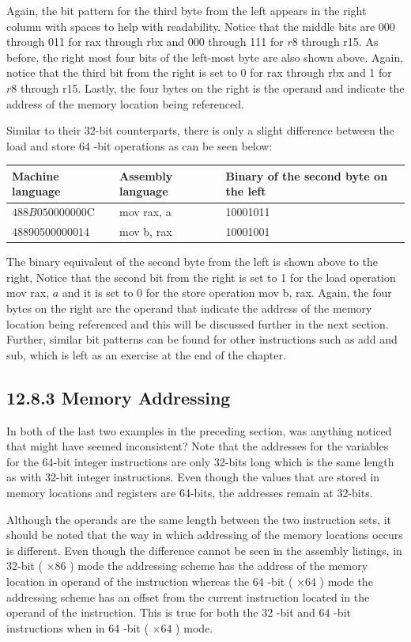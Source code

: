 \documentclass[10pt]{article}
\begin{document}
Again, the bit pattern for the third byte from the left appears in the right column with spaces to help with readability. Notice that the middle bits are 000 through 011 for rax through rbx and 000 through 111 for $r 8$ through r15. As before, the right most four bits of the left-most byte are also shown above. Again, notice that the third bit from the right is set to 0 for rax through rbx and 1 for $r 8$ through r15. Lastly, the four bytes on the right is the operand and indicate the address of the memory location being referenced.

Similar to their 32-bit counterparts, there is only a slight difference between the load and store 64 -bit operations as can be seen below:

\begin{center}
\begin{tabular}{|l|l|l|}
\hline
Machine language & Assembly language & Binary of the second byte on the left \\
\hline
$488 B 050000000 \mathrm{C}$ & mov rax, a & 10001011 \\
\hline
48890500000014 & mov b, rax & 10001001 \\
\hline
\end{tabular}
\end{center}

The binary equivalent of the second byte from the left is shown above to the right, Notice that the second bit from the right is set to 1 for the load operation mov rax, $a$ and it is set to 0 for the store operation mov b, rax. Again, the four bytes on the right are the operand that indicate the address of the memory location being referenced and this will be discussed further in the next section. Further, similar bit patterns can be found for other instructions such as add and sub, which is left as an exercise at the end of the chapter.

\subsection*{12.8.3 Memory Addressing}
In both of the last two examples in the preceding section, was anything noticed that might have seemed inconsistent? Note that the addresses for the variables for the 64-bit integer instructions are only 32-bits long which is the same length as with 32-bit integer instructions. Even though the values that are stored in memory locations and registers are 64-bits, the addresses remain at 32-bits.

Although the operands are the same length between the two instruction sets, it should be noted that the way in which addressing of the memory locations occurs is different. Even though the difference cannot be seen in the assembly listings, in 32-bit ( $\times 86$ ) mode the addressing scheme has the address of the memory location in operand of the instruction whereas the 64 -bit ( $\times 64$ ) mode the addressing scheme has an offset from the current instruction located in the operand of the instruction. This is true for both the 32 -bit and 64 -bit instructions when in 64 -bit ( $\times 64$ ) mode.
\end{document}
